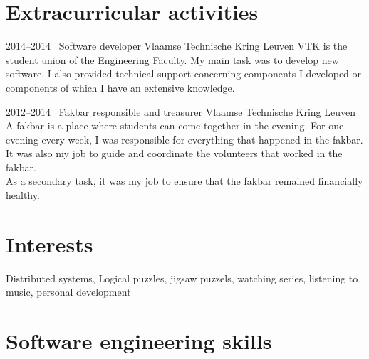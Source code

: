 \documentclass[a4paper]{friggeri-cv} %
\begin{document}
\section{Extracurricular activities}

\begin{entrylist}
\entry
{2014--2014~}
{Software developer}
{Vlaamse Technische Kring Leuven}
{VTK is the student union of the Engineering Faculty. My main task was to develop new software. I also provided technical support concerning components I developed or components of which I have an extensive knowledge.
~}

\entry
{2012--2014~}
{Fakbar responsible and treasurer}
{Vlaamse Technische Kring Leuven}
{A fakbar is a place where students can come together in the evening. For one evening every week, I was responsible for everything that happened in the fakbar. It was also my job to guide and coordinate the volunteers that worked in the fakbar.\\
As a secondary task, it was my job to ensure that the fakbar remained financially healthy.
~}


\end{entrylist}



\section{Interests}

Distributed systems, Logical puzzles, jigsaw puzzels, watching series, listening to music, personal development

\newpage
\addtolength{\oddsidemargin}{-1.7cm}
\addtolength{\evensidemargin}{-1.7cm}

\section{Software engineering skills}
\end{document}
